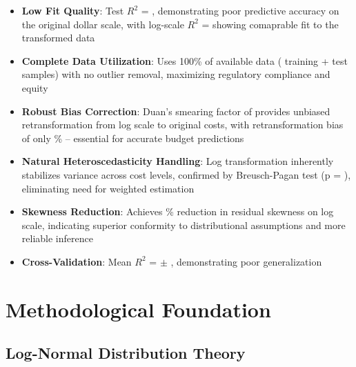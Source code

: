 \begin{itemize}
    \item \textbf{Low Fit Quality}: Test $R^2$ = \MRSquaredTest{}, demonstrating poor predictive accuracy on the original dollar scale, with log-scale $R^2$ = \ModelSixRSquaredLogScale{} showing comaprable fit to the transformed data
    
    \item \textbf{Complete Data Utilization}: Uses 100\% of available data (\MTrainingSamples{} training + \MTestSamples{} test samples) with no outlier removal, maximizing regulatory compliance and equity
    
    \item \textbf{Robust Bias Correction}: Duan's smearing factor of \ModelSixSmearingFactor{} provides unbiased retransformation from log scale to original costs, with retransformation bias of only \ModelSixSmearingBias{}\% -- essential for accurate budget predictions
    
    \item \textbf{Natural Heteroscedasticity Handling}: Log transformation inherently stabilizes variance across cost levels, confirmed by Breusch-Pagan test (p = \ModelSixHeteroscedasticityTest{}), eliminating need for weighted estimation
    
    \item \textbf{Skewness Reduction}: Achieves \ModelSixSkewnessReduction{}\% reduction in residual skewness on log scale, indicating superior conformity to distributional assumptions and more reliable inference
    
    \item \textbf{Cross-Validation}: Mean $R^2$ = \MCVMean{} $\pm$ \MCVStd{}, demonstrating poor generalization
\end{itemize}

\section{Methodological Foundation}

\subsection{Log-Normal Distribution Theory}


    
